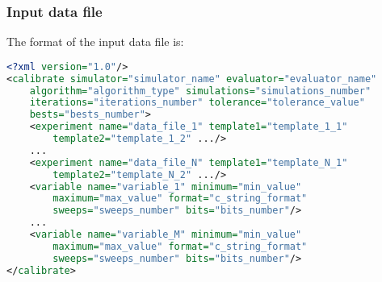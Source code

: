 \documentclass[review,authoryear]{elsarticle}
\begin{document}
\subsubsection{Input data file}

The format of the input data file is:
\begin{lstlisting}[language=xml,basicstyle=\scriptsize]
<?xml version="1.0"/>
<calibrate simulator="simulator_name" evaluator="evaluator_name"
	algorithm="algorithm_type" simulations="simulations_number"
	iterations="iterations_number" tolerance="tolerance_value"
	bests="bests_number">
	<experiment name="data_file_1" template1="template_1_1"
		template2="template_1_2" .../>
	...
	<experiment name="data_file_N" template1="template_N_1"
		template2="template_N_2" .../>
	<variable name="variable_1" minimum="min_value"
		maximum="max_value" format="c_string_format"
		sweeps="sweeps_number" bits="bits_number"/>
	...
	<variable name="variable_M" minimum="min_value"
		maximum="max_value" format="c_string_format"
		sweeps="sweeps_number" bits="bits_number"/>
</calibrate>
\end{lstlisting}
\end{document}
